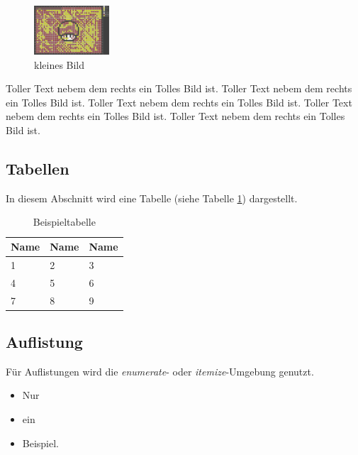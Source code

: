 \documentclass[12pt,a4paper,bibliography=totocnumbered,listof=totocnumbered]{scrartcl}
\begin{document}
    \begin{figure}
    	\centering
    	\includegraphics[width=0.25\textwidth]{pics/gamefield02.png}
    	\caption{kleines Bild}
    	\label{fig:test11111111111111}
    \end{figure}
Toller Text nebem dem rechts ein Tolles Bild ist. Toller Text nebem dem rechts ein Tolles Bild ist. Toller Text nebem dem rechts ein Tolles Bild ist. Toller Text nebem dem rechts ein Tolles Bild ist. Toller Text nebem dem rechts ein Tolles Bild ist.
    \subsection{Tabellen}
    In diesem Abschnitt wird eine Tabelle (siehe Tabelle \ref{tab:beispiel}) dargestellt.

    \vspace{1em}
    \begin{table}[!h]
        \centering
        \begin{tabular}{|l|l|l|}
            \hline
            \textbf{Name} & \textbf{Name} & \textbf{Name}\\
            \hline
            1 & 2 & 3\\
            \hline
            4 & 5 & 6\\
            \hline
            7 & 8 & 9\\
            \hline
        \end{tabular}
        \caption{Beispieltabelle}
        \label{tab:beispiel}
    \end{table}


    \subsection{Auflistung}
    Für Auflistungen wird die \textit{enumerate}- oder \textit{itemize}-Umgebung genutzt.

    \begin{itemize}
        \item Nur
        \item ein
        \item Beispiel.
    \end{itemize}
\end{document}
